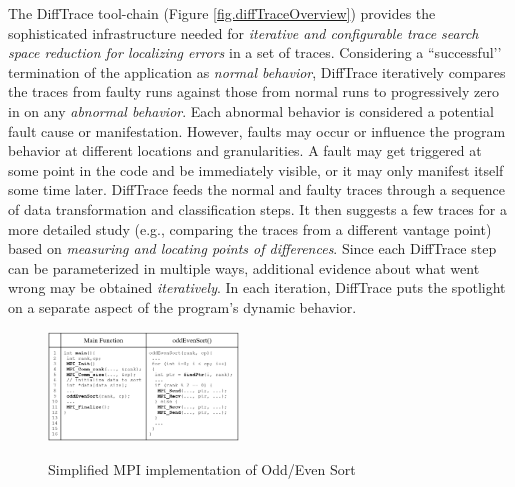 The DiffTrace tool-chain (Figure \ref{fig.diffTraceOverview}) provides the sophisticated infrastructure needed for \textit{iterative and configurable trace search space reduction for localizing errors} in a set of traces.
%
Considering a ``successful’’ termination of the application as \textit{normal behavior}, DiffTrace iteratively compares the traces from faulty runs against those from normal runs to progressively zero in on any \textit{abnormal behavior}.
%
Each abnormal behavior is considered a potential fault cause or manifestation.
%
However, faults may occur or influence the program behavior at different locations and granularities.
%
A fault may get triggered at some point in the code and be immediately visible, or it may only manifest itself some time later.
%
DiffTrace feeds the normal and faulty traces through a sequence of data transformation and classification steps. It then suggests a few traces for a more detailed study (e.g., comparing the traces from a different vantage point) based on \textit{measuring and locating points of differences}.
%
Since each DiffTrace step can be parameterized in multiple ways, additional evidence about what went wrong may be obtained \textit{iteratively}. In each iteration, DiffTrace puts the spotlight on a separate aspect of the program's dynamic behavior.
%

\begin{figure}[]
\centering
\caption{Simplified MPI implementation of Odd/Even Sort}
\includegraphics[width=0.45\textwidth]{figs/oddEven.png}
\label{fig.oddEven}
\end{figure}

